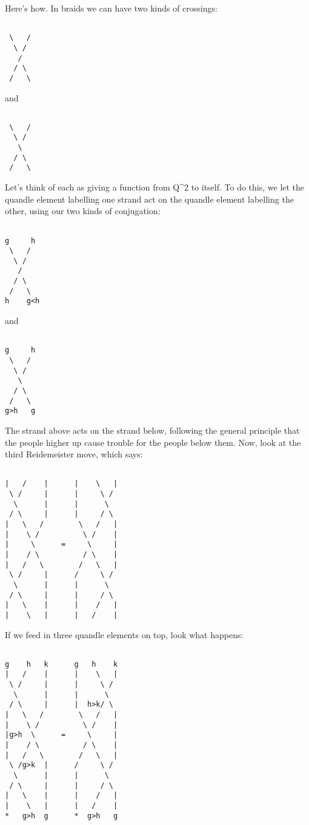 Here's how.  In braids we can have two kinds of crossings:


\begin{verbatim}

 \   /
  \ /
   /
  / \
 /   \
\end{verbatim}
    

and


\begin{verbatim}

 \   /
  \ /
   \
  / \
 /   \
\end{verbatim}
    

Let's think of each as giving a function from Q^{2} to itself.  To
do this, we let the quandle element labelling one strand act on the 
quandle element labelling the other, using our two kinds of 
conjugation:


\begin{verbatim}

g     h
 \   /
  \ /
   /
  / \
 /   \
h    g<h
\end{verbatim}
    
and


\begin{verbatim}

g     h
 \   /
  \ /
   \
  / \
 /   \
g>h   g
\end{verbatim}
    

The strand above acts on the strand below, following the general
principle that the people higher up cause trouble for the people below
them.  Now, look at the third Reidemeister move, which says:


\begin{verbatim}

|   /    |      |    \   |
 \ /     |      |     \ / 
  \      |      |      \
 / \     |      |     / \
|   \   /        \   /   |
|    \ /          \ /    |
|     \      =     \     |	
|    / \          / \    |
|   /   \        /   \   |
 \ /     |      /     \ / 
  \      |      |      \  
 / \     |      |     / \ 
|   \    |      |    /   |
|    \   |      |   /    |
\end{verbatim}
    

If we feed in three quandle elements on top, look what happens:


\begin{verbatim}

g    h   k      g   h    k
|   /    |      |    \   |
 \ /     |      |     \ / 
  \      |      |      \
 / \     |      |  h>k/ \
|   \   /        \   /   |
|    \ /          \ /    |
|g>h  \      =     \     |	
|    / \          / \    |
|   /   \        /   \   |
 \ /g>k  |      /     \ / 
  \      |      |      \  
 / \     |      |     / \ 
|   \    |      |    /   |
|    \   |      |   /    |
*   g>h  g      *  g>h   g
\end{verbatim}
    

